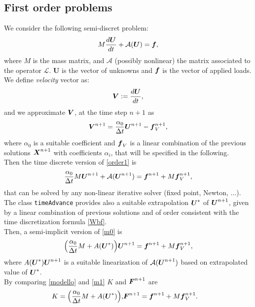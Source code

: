 \documentclass[english,a4paper]{article}
\newcommand{\Xbf}{\text{\mbox{\boldmath $X$}}}
\newcommand{\Ubf}{\text{\mbox{\boldmath $U$}}}
\newcommand{\fbf}{\text{\mbox{\boldmath $f$}}}
\newcommand{\Fbf}{\text{\mbox{\boldmath $F$}}}
\newcommand{\Wbf}{\text{\mbox{\boldmath $V$}}}
\newcommand{\xx}{\boldsymbol}
\begin{document}
\subsection{First  order problems}
We consider the following semi-discret problem:
\begin{equation}\label{order1}
M\frac{d \xx U }{dt} +\mathcal{A}(\xx U) = \fbf ,
\end{equation}
where $M$ is  the mass matrix, and $\mathcal{A}$ (possibly nonlinear) the
matrix associated to the operator $\mathcal{L}$.  $\xx U$ is the
 vector  of unknowns and $\fbf$ is the vector of applied loads.\\
We define {\sl velocity} vector as:
\[
\Wbf:=\frac{d\xx U}{dt},
\]
and we approximate $\Wbf$, at the time step $n+1$ as
\begin{equation}\label{Wbf}
\Wbf^{n+1}=\frac{\alpha_0}{\Delta t}\Ubf^{n+1}- \fbf_V^{n+1},
\end{equation}
where $\alpha_0$ is a suitable coefficient and $\fbf_V$  is a
linear combination of the previous  solutions $\Xbf^{n+1}$ with coefficients
$\alpha_i$, that  will be specified in the following.\\
Then the time discrete version of \eqref{order1} is
\begin{equation}\label{m0}
\frac{\alpha_0}{\Delta t}M\Ubf^{n+1}  +\mathcal{A}(\Ubf^{n+1})=\fbf^{n+1}+ M \fbf_V^{n+1},
\end{equation}
that can be solved by any non-linear iterative solver (fixed point,
Newton, $\dots$). The class \verb"timeAdvance" provides also a
suitable extrapolation $\Ubf^*$ of  $\Ubf^{n+1}$, given by a linear
combination of previous solutions and of order consistent with the
time discretization formula \eqref{Wbf}.\\
Then, a semi-implicit version of
\eqref{m0} is
\begin{equation}\label{m1}
\Big(\frac{\alpha_0}{\Delta t} M +A(\Ubf^*)\Big)\Ubf^{n+1}=\fbf^{n+1}+ M \fbf_V^{n+1},
\end{equation}
where $A(\Ubf^*)\Ubf^{n+1}$ is a suitable linearization of
$\mathcal{A}(\Ubf^{n+1})$ based on extrapolated value  of $\Ubf^*$.\\
By comparing \eqref{modello} and \eqref{m1}  $K$ and $\Fbf^{n+1}$
are
\begin{eqnarray*}
\displaystyle K =\Big(\frac{\alpha_0}{\Delta t} M +A(\Ubf^*)\Big),& \xx F^{n+1}=\xx f^{n+1} + M \fbf_V^{n+1}.
\end{eqnarray*}
\end{document}
